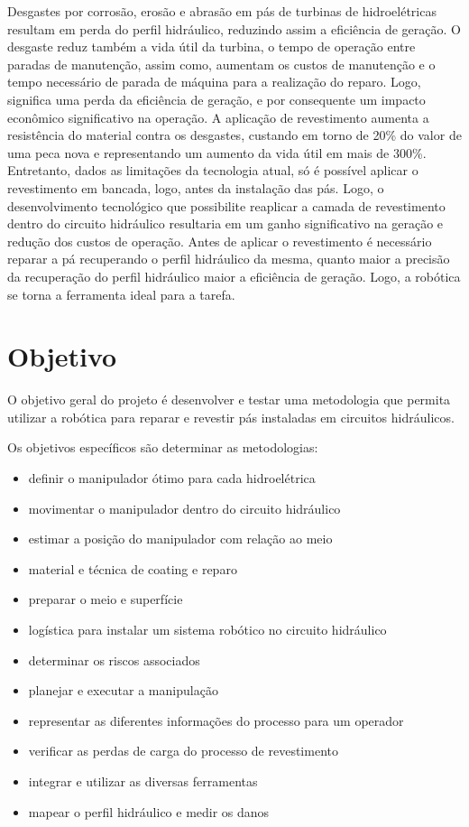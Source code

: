 Desgastes por corrosão, erosão e abrasão em pás de turbinas de hidroelétricas
resultam em perda do perfil hidráulico, reduzindo assim a eficiência de geração.
O desgaste reduz também a vida útil da turbina, o tempo de operação entre
paradas de manutenção, assim como, aumentam os custos de manutenção e o tempo
necessário de parada de máquina para a realização do reparo. Logo, significa uma
perda da eficiência de geração, e por consequente um impacto econômico
significativo na operação.
A aplicação de revestimento aumenta a resistência do material contra os
desgastes, custando em torno de 20\% do valor de uma peca nova e representando
um aumento da vida útil em mais de 300\%. Entretanto, dados as limitações da
tecnologia atual, só é possível aplicar o revestimento em bancada, logo, antes
da instalação das pás. Logo, o desenvolvimento tecnológico que possibilite
reaplicar a camada de revestimento dentro do circuito hidráulico resultaria em
um ganho significativo na geração e redução dos custos de operação.
Antes de aplicar o revestimento é necessário reparar a pá recuperando o perfil
hidráulico da mesma, quanto maior a precisão da recuperação do perfil hidráulico
maior a eficiência de geração. Logo, a robótica se torna a ferramenta ideal para a tarefa.

\section{Objetivo}

O objetivo geral do projeto é desenvolver e testar uma metodologia que permita
utilizar a robótica para reparar e revestir pás instaladas em circuitos hidráulicos.

Os objetivos específicos são determinar as metodologias: 

\begin{itemize}
  \item definir o manipulador ótimo para cada hidroelétrica 
  \item movimentar o manipulador dentro do circuito hidráulico
  \item estimar a posição do manipulador com relação ao meio
  \item material e técnica de coating e reparo 
  \item preparar o meio e superfície
  \item logística para instalar um sistema robótico no circuito hidráulico
  \item determinar os riscos associados
  \item planejar e executar a manipulação
  \item representar as diferentes informações do processo para um operador
  \item verificar as perdas de carga do processo de revestimento
  \item integrar e utilizar as diversas ferramentas
  \item mapear o perfil hidráulico e medir os danos
\end{itemize}

